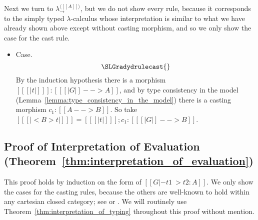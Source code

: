Next we turn to $\lambda^{\langle [[A]] \rangle }_\to$, but we do
not show every rule, because it corresponds to the simply typed
$\lambda$-calculus whose interpretation is similar to what we have
already shown above except without casting morphism, and so we only
show the case for the cast rule.
\begin{itemize}
\item[] Case.
  \[
  \SLGradydrulecast{}
  \]
  By the induction hypothesis there is a morphism $[[ [| t |] ]] : [[ [| G |] --> A]]$,
  and by type consistency in the model (Lemma~\ref{lemma:type_consistency_in_the_model})
  there is a casting morphism $c_1 : [[A --> B]]$.  So take
  $[[ [| < B > t |] ]] = [[ [| t |] ]];c_1 : [[ [| G |] --> B]]$.
\end{itemize}


\subsection{Proof of Interpretation of Evaluation (Theorem~\ref{thm:interpretation_of_evaluation})}
\label{subsec:proof_of_interpretation_of_evaluation}
This proof holds by induction on the form of $[[G |- t1 ~> t2 : A]]$.
We only show the cases for the casting rules, because the others are
well-known to hold within any cartesian closed category; see
\cite{Lambek:1980} or \cite{Crole:1994}.  We will routinely use
Theorem~\ref{thm:interpretation_of_typing} throughout this proof
without mention.

